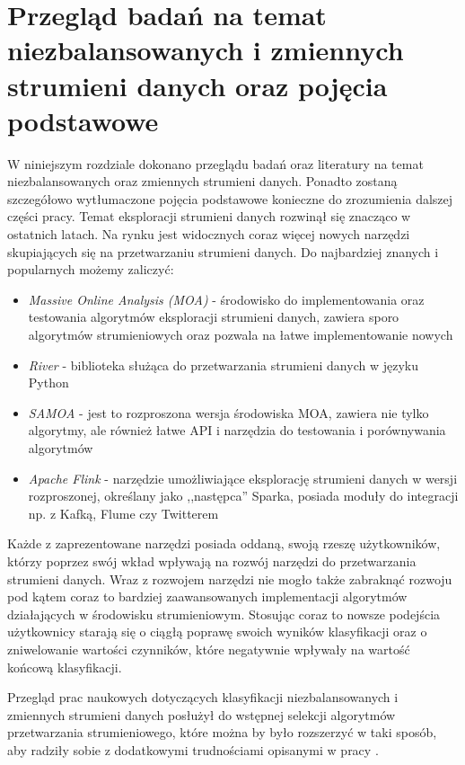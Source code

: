 \chapter{Przegląd badań na temat niezbalansowanych i zmiennych strumieni danych oraz pojęcia podstawowe}

\noindent W niniejszym rozdziale dokonano przeglądu badań oraz literatury na temat niezbalansowanych oraz zmiennych strumieni danych. Ponadto zostaną szczegółowo wytłumaczone pojęcia podstawowe konieczne do zrozumienia dalszej części pracy. Temat eksploracji strumieni danych rozwinął się znacząco w ostatnich latach. Na rynku jest widocznych coraz więcej nowych narzędzi skupiających się na przetwarzaniu strumieni danych. Do najbardziej znanych i popularnych możemy zaliczyć:

\begin{itemize}
    \item \textit{Massive Online Analysis (MOA)} - środowisko do implementowania oraz testowania algorytmów eksploracji strumieni danych, zawiera sporo algorytmów strumieniowych oraz pozwala na łatwe implementowanie nowych \cite{Article:MOA}
    \item \textit{River} - biblioteka służąca do przetwarzania strumieni danych w języku Python \cite{Article:River}
    \item \textit{SAMOA} - jest to rozproszona wersja środowiska MOA, zawiera nie tylko algorytmy, ale również łatwe API i narzędzia do testowania i porównywania algorytmów \cite{Article:Samoa}
    \item \textit{Apache Flink} - narzędzie umożliwiające eksplorację strumieni danych w wersji rozproszonej, określany jako ,,następca'' Sparka, posiada moduły do integracji np. z Kafką, Flume czy Twitterem \cite{Article:Flink}
\end{itemize}

\noindent Każde z zaprezentowane narzędzi posiada oddaną, swoją rzeszę użytkowników, którzy poprzez swój wkład wpływają na rozwój narzędzi do przetwarzania strumieni danych. Wraz z rozwojem narzędzi nie mogło także zabraknąć rozwoju pod kątem coraz to bardziej zaawansowanych implementacji algorytmów działających w środowisku strumieniowym. Stosując coraz to nowsze podejścia użytkownicy starają się o ciągłą poprawę swoich wyników klasyfikacji oraz o zniwelowanie wartości czynników, które negatywnie wpływały na wartość końcową klasyfikacji. 

Przegląd prac naukowych dotyczących klasyfikacji niezbalansowanych i zmiennych strumieni danych posłużył do wstępnej selekcji algorytmów przetwarzania strumieniowego, które można by było rozszerzyć w taki sposób, aby radziły sobie z dodatkowymi trudnościami opisanymi w pracy \cite{Article:TypyPrzykladow}.

